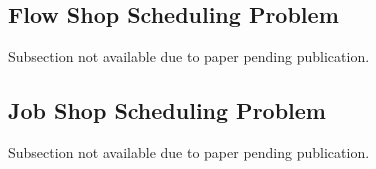 \subsection{Flow Shop Scheduling Problem}
{\color{red} Subsection not available due to paper pending publication.}







\subsection{Job Shop Scheduling Problem}
{\color{red} Subsection not available due to paper pending publication.}













